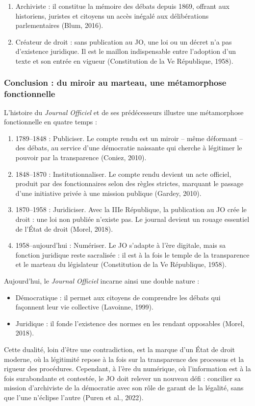 \begin{enumerate}
\item Archiviste : il constitue la mémoire des débats depuis 1869, offrant aux historiens, juristes et citoyens un accès inégalé aux délibérations parlementaires (Blum, 2016).
\item Créateur de droit : sans publication au JO, une loi ou un décret n’a pas d’existence juridique. Il est le maillon indispensable entre l’adoption d’un texte et son entrée en vigueur (Constitution de la Ve République, 1958).

\end{enumerate}
\subsubsection{Conclusion : du miroir au marteau, une métamorphose fonctionnelle}

L’histoire du \emph{Journal Officiel} et de ses prédécesseurs illustre une métamorphose fonctionnelle en quatre temps :

\begin{enumerate}
\item 1789–1848 : Publiciser. Le compte rendu est un miroir – même déformant – des débats, au service d’une démocratie naissante qui cherche à légitimer le pouvoir par la transparence (Coniez, 2010).
\item 1848–1870 : Institutionnaliser. Le compte rendu devient un acte officiel, produit par des fonctionnaires selon des règles strictes, marquant le passage d’une initiative privée à une mission publique (Gardey, 2010).
\item 1870–1958 : Juridiciser. Avec la IIIe République, la publication au JO crée le droit : une loi non publiée n’existe pas. Le journal devient un rouage essentiel de l’État de droit (Morel, 2018).
\item 1958–aujourd’hui : Numériser. Le JO s’adapte à l’ère digitale, mais sa fonction juridique reste sacralisée : il est à la fois le temple de la transparence et le marteau du législateur (Constitution de la Ve République, 1958).

\end{enumerate}
Aujourd’hui, le \emph{Journal Officiel} incarne ainsi une double nature :

\begin{itemize}
\item Démocratique : il permet aux citoyens de comprendre les débats qui façonnent leur vie collective (Lavoinne, 1999).
\item Juridique : il fonde l’existence des normes en les rendant opposables (Morel, 2018).

\end{itemize}
Cette dualité, loin d’être une contradiction, est la marque d’un État de droit moderne, où la légitimité repose à la fois sur la transparence des processus et la rigueur des procédures. Cependant, à l’ère du numérique, où l’information est à la fois surabondante et contestée, le JO doit relever un nouveau défi : concilier sa mission d’archiviste de la démocratie avec son rôle de garant de la légalité, sans que l’une n’éclipse l’autre (Puren et al., 2022).

